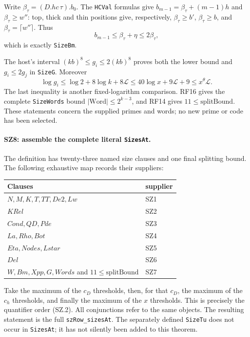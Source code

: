 \documentclass[11pt,a4paper]{article}
\numberwithin{equation}{section}
\theoremstyle{remark}\newtheorem{remark}[theorem]{Remark}
\begin{document}
Write $\beta_\tau=(D.hc\,\tau).b_0$. The \texttt{HCVal}
formulas give $b_{m-1}=\beta_\tau+(m-1)h$ and
$\beta_\tau\geq w''$: top, thick and thin positions give,
respectively, $\beta_\tau\geq b'$, $\beta_\tau\geq b$, and
$\beta_\tau=\lceil w''\rceil$. Thus
\[
       b_{m-1}\leq\beta_\tau+\eta\leq2\beta_\tau,
\]
which is exactly \texttt{SizeBm}.

The host's interval $(kb)^8\leq g_i\leq2(kb)^8$ proves both
the lower bound and $g_i\leq2g_j$ in \texttt{SizeG}. Moreover
\[
 \log g_i\leq\log2+8\log k+8\mathcal L
          \leq40\log x+9\mathcal L+9
          \leq x^\theta\mathcal L.
\]
The last inequality is another fixed-logarithm comparison. RF16 gives
the complete \texttt{SizeWords} bound
$|\mathrm{Word}|\leq2^{k-3}$, and RF14 gives
$11\leq\mathrm{splitBound}$. These statements concern the supplied
primes and words; no new prime or code has been selected.

\paragraph{SZ8: assemble the complete literal \texttt{SizesAt}.}
The definition has twenty-three named size clauses and one final
splitting bound. The following exhaustive map records their suppliers:
\begin{center}\small
\begin{tabular}{p{}l}
Clauses & supplier\\\hline
$N,M,K,T,TT,De2,Lw$ & SZ1\\
$KRel$ & SZ2\\
$Cond,QD,Pde$ & SZ3\\
$La,Rho,Bot$ & SZ4\\
$Eta,Nodes,Lstar$ & SZ5\\
$Del$ & SZ6\\
$W,Bm,Xpp,G,Words$ and $11\leq\mathrm{splitBound}$ & SZ7
\end{tabular}
\end{center}
Take the maximum of the $c_D$ thresholds, then, for that $c_D$,
the maximum of the $c_h$ thresholds, and finally the maximum of the
$x$ thresholds. This is precisely the quantifier order (SZ.2).
All conjunctions refer to the same objects. The resulting statement is
the full \texttt{szRow\_\allowbreak sizesAt}. The separately defined
\texttt{SizeTu} does not occur in \texttt{SizesAt}; it has not
silently been added to this theorem.
\end{document}
